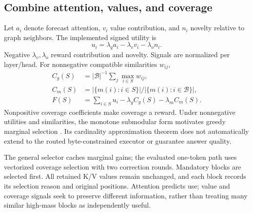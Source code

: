 \subsection{Combine attention, values, and coverage}
Let $a_i$ denote forecast attention, $v_i$ value contribution, and $n_i$ novelty
relative to graph neighbors. The implemented signed utility is
\begin{equation}
 u_i=\lambda_q a_i-\lambda_v v_i-\lambda_o n_i.
 \label{eq:utility}
\end{equation}
Negative $\lambda_v,\lambda_o$ reward contribution and novelty. Signals are
normalized per layer/head. For nonnegative compatible similarities $w_{ij}$,
\begin{align}
 C_g(S)&=|\mathcal B|^{-1}\sum_j\max_{i\in S}w_{ij},\\
 C_m(S)&=|\{m(i):i\in S\}|/|\{m(i):i\in\mathcal B\}|,\\
 F(S)&=\sum_{i\in S}u_i-\lambda_g C_g(S)-\lambda_m C_m(S).
 \label{eq:objective}
\end{align}
Nonpositive coverage coefficients make coverage a reward. Under nonnegative
utilities and similarities, the monotone submodular form motivates greedy
marginal selection \citep{nemhauser1978}. Its cardinality approximation theorem
does not automatically extend to the routed byte-constrained executor or
guarantee answer quality.

The general selector caches marginal gains; the evaluated one-token path uses
vectorized coverage selection with two correction rounds. Mandatory blocks
are selected first. All retained K/V values remain unchanged, and each block
records its selection reason and original positions. Attention predicts use;
value and coverage signals seek to preserve different information, rather
than treating many similar high-mass blocks as independently useful.

